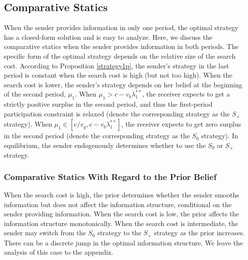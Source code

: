 \documentclass[11pt]{extarticle}
\begin{document}

\subsection{Comparative Statics}
When the sender provides information in only one period, the optimal strategy has a closed-form solution and is easy to analyze. Here, we discuss the comparative statics when the sender provides information in both periods. The specific form of the optimal strategy depends on the relative size of the search cost. According to Proposition \ref{strategy1p}, the sender's strategy in the last period is constant when the search cost is high (but not too high). When the search cost is lower, the sender’s strategy depends on her belief at the beginning of the second period, $\mu_1$. When $\mu_1 > c - v_b \lambda_1^{**}$, the receiver expects to get a strictly positive surplus in the second period, and thus the first-period participation constraint is relaxed (denote the corresponding strategy as the $S_+$ strategy). When $\mu_1 \in [c/v_g, c - v_b\lambda_1^{**}]$, the receiver expects to get zero surplus in the second period (denote the corresponding strategy as the $S_0$ strategy). In equilibrium, the sender endogenously determines whether to use the $S_0$ or $S_+$ strategy.

\subsubsection{Comparative Statics With Regard to the Prior Belief}
When the search cost is high, the prior determines whether the sender smooths information but does not affect the information structure, conditional on the sender providing information. When the search cost is low, the prior affects the information structure monotonically. When the search cost is intermediate, the sender may switch from the $S_0$ strategy to the $S_+$ strategy as the prior increases. There can be a discrete jump in the optimal information structure. We leave the analysis of this case to the appendix.
\end{document}
